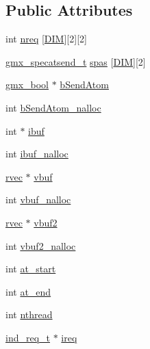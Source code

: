 \subsection*{\-Public \-Attributes}
\begin{DoxyCompactItemize}
\item 
int \hyperlink{structgmx__domdec__specat__comm_adbbbaab432d7b95d7810737310fe2058}{nreq} \mbox{[}\hyperlink{share_2template_2gromacs_2types_2simple_8h_ac25189db92959bff3c6c2adf4c34b50a}{\-D\-I\-M}\mbox{]}\mbox{[}2\mbox{]}\mbox{[}2\mbox{]}
\item 
\hyperlink{structgmx__specatsend__t}{gmx\-\_\-specatsend\-\_\-t} \hyperlink{structgmx__domdec__specat__comm_aeab852f0459cdaaf3102d97e52f36118}{spas} \mbox{[}\hyperlink{share_2template_2gromacs_2types_2simple_8h_ac25189db92959bff3c6c2adf4c34b50a}{\-D\-I\-M}\mbox{]}\mbox{[}2\mbox{]}
\item 
\hyperlink{include_2types_2simple_8h_a8fddad319f226e856400d190198d5151}{gmx\-\_\-bool} $\ast$ \hyperlink{structgmx__domdec__specat__comm_afc068510eeb667e940ebf0ead7c9a9b8}{b\-Send\-Atom}
\item 
int \hyperlink{structgmx__domdec__specat__comm_a9c50e541595f9128babf0263dfd29918}{b\-Send\-Atom\-\_\-nalloc}
\item 
int $\ast$ \hyperlink{structgmx__domdec__specat__comm_a7b23fd1fb41e8f18967cb945d2f706ed}{ibuf}
\item 
int \hyperlink{structgmx__domdec__specat__comm_afb4d86d8858a5a9b015e78d62509ee6e}{ibuf\-\_\-nalloc}
\item 
\hyperlink{share_2template_2gromacs_2types_2simple_8h_aa02a552a4abd2f180c282a083dc3a999}{rvec} $\ast$ \hyperlink{structgmx__domdec__specat__comm_ac57ad8b84cb7364f8cdb7094cc025d3c}{vbuf}
\item 
int \hyperlink{structgmx__domdec__specat__comm_a9f2944932f97daf251be270ddeffc844}{vbuf\-\_\-nalloc}
\item 
\hyperlink{share_2template_2gromacs_2types_2simple_8h_aa02a552a4abd2f180c282a083dc3a999}{rvec} $\ast$ \hyperlink{structgmx__domdec__specat__comm_abb473ac78f0e463fc479d333d6a54435}{vbuf2}
\item 
int \hyperlink{structgmx__domdec__specat__comm_aba0616e53bb3e1ec7294f517bfee429a}{vbuf2\-\_\-nalloc}
\item 
int \hyperlink{structgmx__domdec__specat__comm_ad3ec7ad7830e09ca80219763f79fd5d4}{at\-\_\-start}
\item 
int \hyperlink{structgmx__domdec__specat__comm_a631973322fcb25fde0d78baf789dad9f}{at\-\_\-end}
\item 
int \hyperlink{structgmx__domdec__specat__comm_ac70c4a7345c1d85ae695caf103bec076}{nthread}
\item 
\hyperlink{structind__req__t}{ind\-\_\-req\-\_\-t} $\ast$ \hyperlink{structgmx__domdec__specat__comm_a6cb857beab5891010bf3e9e399e6ce84}{ireq}
\end{DoxyCompactItemize}


